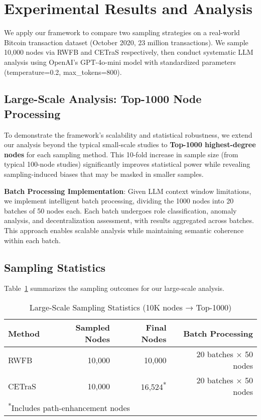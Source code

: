 
\section{Experimental Results and Analysis}\label{sec:results}

We apply our framework to compare two sampling strategies on a real-world Bitcoin transaction dataset (October 2020, 23 million transactions). We sample 10,000 nodes via RWFB and CETraS respectively, then conduct systematic LLM analysis using OpenAI's GPT-4o-mini model with standardized parameters (temperature=0.2, max\_tokens=800).

\subsection{Large-Scale Analysis: Top-1000 Node Processing}

To demonstrate the framework's scalability and statistical robustness, we extend our analysis beyond the typical small-scale studies to \textbf{Top-1000 highest-degree nodes} for each sampling method. This 10-fold increase in sample size (from typical 100-node studies) significantly improves statistical power while revealing sampling-induced biases that may be masked in smaller samples.

\textbf{Batch Processing Implementation}: Given LLM context window limitations, we implement intelligent batch processing, dividing the 1000 nodes into 20 batches of 50 nodes each. Each batch undergoes role classification, anomaly analysis, and decentralization assessment, with results aggregated across batches. This approach enables scalable analysis while maintaining semantic coherence within each batch.

\subsection{Sampling Statistics}

Table~\ref{tab:sampling-stats-1000} summarizes the sampling outcomes for our large-scale analysis.

\begin{table}[!t]
\centering
\caption{Large-Scale Sampling Statistics (10K nodes → Top-1000)}
\label{tab:sampling-stats-1000}
\begin{tabular}{l r r r}
\toprule
Method & Sampled Nodes & Final Nodes & Batch Processing \\
\midrule
RWFB & 10,000 & 10,000 & 20 batches × 50 nodes \\
CETraS & 10,000 & 16,524\textsuperscript{*} & 20 batches × 50 nodes \\
\bottomrule
\multicolumn{4}{l}{\textsuperscript{*}Includes path-enhancement nodes}
\end{tabular}
\end{table}

